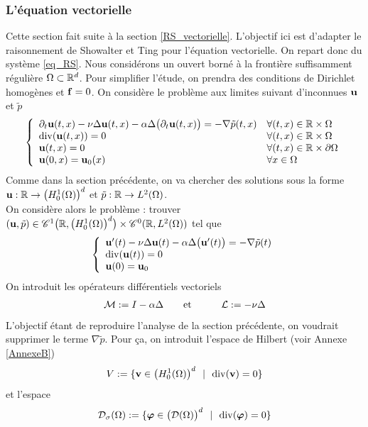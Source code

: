 \subsubsection{L'équation vectorielle}
Cette section fait suite à la section \ref{RS_vectorielle}. 
L'objectif ici est d'adapter le raisonnement de Showalter et Ting 
pour l'équation vectorielle. On repart donc du système 
\eqref{eq_RS}. Nous considérons un ouvert borné à la frontière 
suffisamment régulière $\Omega \subset \mathbb{R}^d$. 
Pour simplifier l'étude, on prendra des conditions de 
Dirichlet homogènes et $\bm{\mathrm{f}}=0$. On considère le problème 
aux limites suivant
d'inconnues $\bm{\mathrm{u}}$ et $\tilde{p}$
\begin{equation*}
    \left\{\begin{array}{ll}
        \partial_t\bm{\mathrm{u}}(t,x) - \nu\Delta \bm{\mathrm{u}}(t,x) - \alpha\Delta \big(\partial_t \bm{\mathrm{u}}(t,x)\big) = -\nabla \tilde{p}(t,x) & \forall (t,x) \in \mathbb{R} \times \Omega  \\
         \mathrm{div} (\bm{\mathrm{u}}(t,x)) = 0 & \forall (t,x) \in \mathbb{R} \times \Omega \\
         \bm{\mathrm{u}}(t,x) = 0 & \forall (t,x) \in \mathbb{R} \times \partial \Omega \\
         \bm{\mathrm{u}}(0,x) = \bm{\mathrm{u}}_0(x) & \forall x \in \Omega
    \end{array}\right.
\end{equation*}
Comme dans la section précédente, on va chercher des solutions sous la forme
$\bm{\mathrm{u}} : \mathbb{R} \rightarrow \big(H^1_0(\Omega)\big)^d$ et $\tilde{p} : \mathbb{R} \rightarrow L^2(\Omega)$.
\\
On considère alors le problème : trouver $(\bm{\mathrm{u}},\tilde{p}) \in \mathscr{C}^1\big(\mathbb{R}, \big(H^1_0(\Omega)\big)^d\big) \times \mathscr{C}^0(\mathbb{R}, L^2(\Omega))$ tel que
\begin{equation*}
    \left\{\begin{array}{l}
        \bm{\mathrm{u}}'(t) - \nu\Delta \bm{\mathrm{u}}(t) - \alpha\Delta \big(\bm{\mathrm{u}}'(t)\big) = -\nabla \tilde{p}(t) \\
         \mathrm{div} (\bm{\mathrm{u}}(t)) = 0 \\
         \bm{\mathrm{u}}(0) = \bm{\mathrm{u}}_0 
    \end{array}\right.
\end{equation*}
On introduit les opérateurs différentiels vectoriels
\begin{eqnarray*}
    \calM := I - \alpha \Delta \ \ \ \ \ &\text{ et }& \ \ \ \ \ \calL := -\nu \Delta
\end{eqnarray*}
L'objectif étant de reproduire l'analyse de la section précédente, on voudrait \og supprimer \fg{} le terme 
$\nabla \tilde{p}$. Pour ça, on introduit l'espace de Hilbert (voir Annexe \ref{AnnexeB})
\begin{equation*}
    V := \{\bm{\mathrm{v}} \in \big(H^1_0(\Omega)\big)^d \ \ | \ \ \mathrm{div}(\bm{\mathrm{v}}) = 0\}
\end{equation*}
et l'espace 
\begin{equation*}
    \mathcal{D}_{\sigma}(\Omega) := \{\bm{\mathrm{\varphi}} \in \big(\mathcal{D}(\Omega)\big)^d \ \ | \ \ \mathrm{div}(\bm{\mathrm{\varphi}}) = 0\}
\end{equation*}

